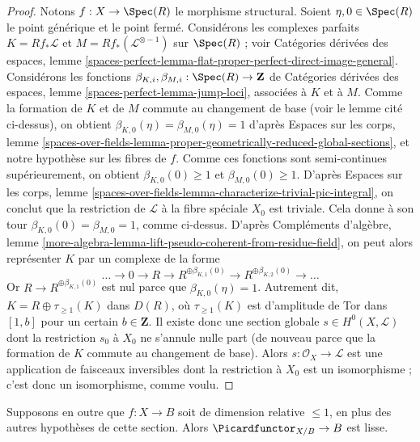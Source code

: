 \begin{proof}
\medskip\noindent
Notons $f : X \to \Spec(R)$ le morphisme structural.
Soient $\eta, 0 \in \Spec(R)$ le point générique et le point fermé.
Considérons les complexes parfaits
$K = Rf_*\mathcal{L}$ et $M = Rf_*(\mathcal{L}^{\otimes -1})$
sur $\Spec(R)$ ; voir Catégories dérivées des espaces, lemme
\ref{spaces-perfect-lemma-flat-proper-perfect-direct-image-general}.
Considérons les fonctions
$\beta_{K, i}, \beta_{M, i} : \Spec(R) \to \mathbf{Z}$
de Catégories dérivées des espaces, lemme
\ref{spaces-perfect-lemma-jump-loci}, associées à $K$ et à $M$.
Comme la formation de $K$ et de $M$ commute au changement de base (voir le
lemme cité ci-dessus), on obtient
$\beta_{K, 0}(\eta) = \beta_{M, 0}(\eta) = 1$ d'après Espaces sur les
corps, lemme
\ref{spaces-over-fields-lemma-proper-geometrically-reduced-global-sections},
et notre hypothèse sur les fibres de $f$.
Comme ces fonctions sont semi-continues supérieurement, on obtient
$\beta_{K, 0}(0) \geq 1$ et $\beta_{M, 0}(0) \geq 1$.
D'après Espaces sur les corps, lemme
\ref{spaces-over-fields-lemma-characterize-trivial-pic-integral}, on
conclut que la restriction de $\mathcal{L}$ à la fibre spéciale $X_0$ est
triviale. Cela donne à son tour
$\beta_{K, 0}(0) = \beta_{M, 0} = 1$, comme ci-dessus.
D'après Compléments d'algèbre, lemme
\ref{more-algebra-lemma-lift-pseudo-coherent-from-residue-field}, on peut
alors représenter $K$ par un complexe de la forme
$$
\ldots \to 0 \to R \to R^{\oplus \beta_{K, 1}(0)} \to
R^{\oplus \beta_{K, 2}(0)} \to \ldots
$$
Or $R \to R^{\oplus \beta_{K, 1}(0)}$ est nul parce que
$\beta_{K, 0}(\eta) = 1$. Autrement dit,
$K = R \oplus \tau_{\geq 1}(K)$ dans $D(R)$, où
$\tau_{\geq 1}(K)$ est d'amplitude de Tor dans $[1, b]$ pour un certain
$b \in \mathbf{Z}$.
Il existe donc une section globale $s \in H^0(X, \mathcal{L})$ dont la
restriction $s_0$ à $X_0$ ne s'annule nulle part (de nouveau parce que la
formation de $K$ commute au changement de base).
Alors $s : \mathcal{O}_X \to \mathcal{L}$ est une application de faisceaux
inversibles dont la restriction à $X_0$ est un isomorphisme ; c'est donc
un isomorphisme, comme voulu.
\end{proof}

\begin{lemma}
\label{lemma-pic-functor-curves-smooth}
Supposons en outre que $f : X \to B$ soit de dimension relative
$\leq 1$, en plus des autres hypothèses de cette section. Alors
$\Picardfunctor_{X/B} \to B$ est lisse.
\end{lemma}

